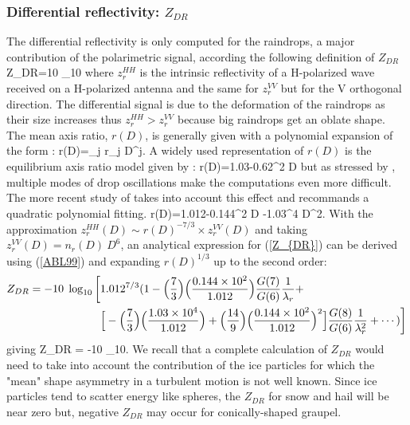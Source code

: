 %
\subsubsection{Differential reflectivity: $Z_{DR}$}
%
The differential reflectivity is only computed for the raindrops, a major
contribution of the polarimetric signal, according the following definition of 
$Z_{DR}$
%
\beq\label{Z_{DR}}
Z_{DR}=10\; \log_{10}
\eeq
%
\noindent where $z^{HH}_r$ is the intrinsic reflectivity of a H-polarized wave 
received on a H-polarized antenna and the same for $z^{VV}_r$ but for 
the V orthogonal direction. The differential signal is due to the deformation 
of the raindrops as their size increases thus $z^{HH}_r>z^{VV}_r$ because big
raindrops get an oblate shape. The mean axis ratio, $r(D)$, is generally given 
with a polynomial expansion of the form \citep{Chuang1990}:
%
\beq\label{axis}
r(D)=\sum_j r_j D^j.
\eeq
%
A widely used representation of $r(D)$ is the equilibrium axis ratio model
given by \citet{Pruppacher1970}:
%
\beq\label{PB70}
r(D)=1.03-0.62^{2} \times D
\eeq
%
\noindent but as stressed by \citet{Jameson1983}, multiple modes of drop oscillations
make the computations even more difficult. The more recent study of 
\citet{Andsager1999} takes into account this effect and recommands a 
quadratic polynomial fitting.
%
\beq\label{ABL99}
r(D)=1.012-0.144^{2} \times D -1.03^{4} \times D^2.
\eeq
%
With the approximation $z^{HH}_r(D) \sim r(D)^{-7/3} \times z^{VV}_r(D)$ 
\citep{Jameson1983} and taking $z^{VV}_r(D)=n_r(D)\ D^6$, an analytical expression 
for (\ref{Z_{DR}}) can be derived using (\ref{ABL99}) and expanding 
$r(D)^{1/3}$ up to the second order:
%
\begin{eqnarray}
Z_{DR} = -10\; \log_{10}\bigg[ &
1.012^{7/3}(1-\Big(\frac{7}{3}\Big)\Big(\frac{0.144 \times 10^{2}}{1.012}\Big)\frac{G(7)}{G(6)}\frac{1}{\lambda_r}+ \notag \\
& \Big[-\Big(\frac{7}{3}\Big)\Big(\frac{1.03 \times 10^{4}}{1.012}\Big)+\Big(\frac{14}{9}\Big)\Big(\frac{0.144 \times 10^{2}}{1.012}\Big)^2\Big]\frac{G(8)}{G(6)}\frac{1}{\lambda_r^2}+\dotsb)\bigg]
\end{eqnarray}
%
giving
%
\beq\label{approxZABL_{DR}}
Z_{DR} = -10\; \log_{10}.
\eeq
%
We recall that a complete calculation of 
$Z_{DR}$ would need to take into account the contribution of the ice particles
for which the "mean" shape asymmetry in a turbulent motion is not well known.
Since ice particles tend to scatter energy like spheres, the $Z_{DR}$ for snow
and hail will be near zero but, negative $Z_{DR}$ may occur for 
conically-shaped graupel.

